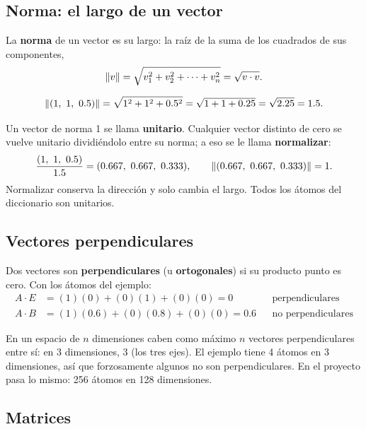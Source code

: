 \documentclass[11pt,letterpaper]{article}
\newcommand{\raiz}[1]{\sqrt{#1}}
\begin{document}
\subsection*{Norma: el largo de un vector}

\begin{definicion}[Norma]
    La \textbf{norma} de un vector es su largo: la raíz de la suma de
    los cuadrados de sus componentes,
    \[
        \norm{v} = \raiz{v_1^2 + v_2^2 + \cdots + v_n^2}
                 = \raiz{v \cdot v} .
    \]
\end{definicion}

\begin{ejemplo}
    \[
        \norm{(1,\ 1,\ 0.5)} = \raiz{1^2 + 1^2 + 0.5^2}
                             = \raiz{1 + 1 + 0.25}
                             = \raiz{2.25} = 1.5 .
    \]
\end{ejemplo}

Un vector de norma 1 se llama \textbf{unitario}. Cualquier vector
distinto de cero se vuelve unitario dividiéndolo entre su norma; a eso
se le llama \textbf{normalizar}:
\[
    \frac{(1,\ 1,\ 0.5)}{1.5} = (0.667,\ 0.667,\ 0.333),
    \qquad
    \norm{(0.667,\ 0.667,\ 0.333)} = 1 .
\]
Normalizar conserva la dirección y solo cambia el largo. Todos los
átomos del diccionario son unitarios.

\subsection*{Vectores perpendiculares}

Dos vectores son \textbf{perpendiculares} (u \textbf{ortogonales}) si su
producto punto es cero. Con los átomos del ejemplo:
\begin{align*}
    A \cdot E &= (1)(0) + (0)(1) + (0)(0) = 0
        && \text{perpendiculares} \\
    A \cdot B &= (1)(0.6) + (0)(0.8) + (0)(0) = 0.6
        && \text{no perpendiculares}
\end{align*}

\begin{ojo}
    En un espacio de $n$ dimensiones caben como máximo $n$ vectores
    perpendiculares entre sí: en 3 dimensiones, 3 (los tres ejes). El
    ejemplo tiene 4 átomos en 3 dimensiones, así que forzosamente
    algunos no son perpendiculares. En el proyecto pasa lo mismo: 256
    átomos en 128 dimensiones.
\end{ojo}

\subsection*{Matrices}
\end{document}
